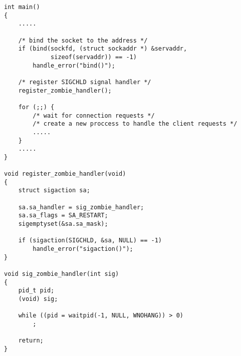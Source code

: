 \begin{lstlisting}[title=server.c]
int main()
{
    ..... 

    /* bind the socket to the address */
    if (bind(sockfd, (struct sockaddr *) &servaddr, 
             sizeof(servaddr)) == -1)
        handle_error("bind()");

    /* register SIGCHLD signal handler */
    register_zombie_handler();

    for (;;) {
        /* wait for connection requests */
        /* create a new proccess to handle the client requests */
        ..... 
    }
    .....
}

void register_zombie_handler(void)
{
    struct sigaction sa;

    sa.sa_handler = sig_zombie_handler;
    sa.sa_flags = SA_RESTART;
    sigemptyset(&sa.sa_mask);

    if (sigaction(SIGCHLD, &sa, NULL) == -1)
        handle_error("sigaction()");
}

void sig_zombie_handler(int sig)
{
    pid_t pid;
    (void) sig;

    while ((pid = waitpid(-1, NULL, WNOHANG)) > 0)
        ;

    return;
}
\end{lstlisting}
